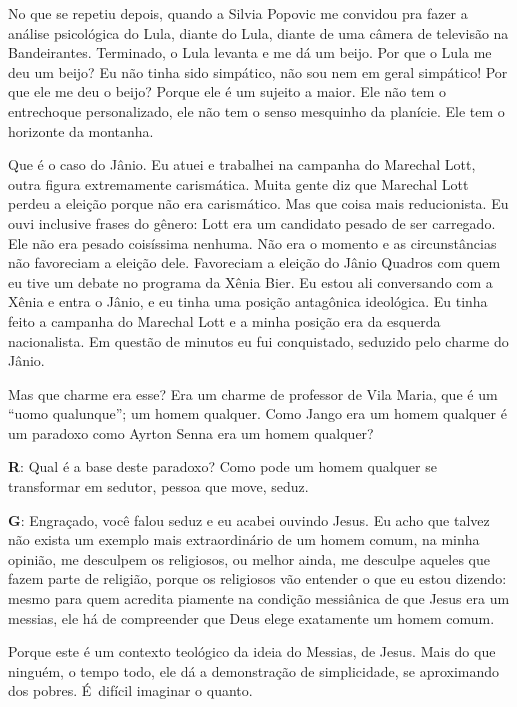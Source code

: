  

No que se repetiu depois, quando a Silvia Popovic me convidou pra fazer
a análise psicológica do Lula, diante do Lula, diante de uma câmera de
televisão na  Bandeirantes. Terminado, o Lula levanta e me dá um
beijo. Por que o Lula me deu um beijo? Eu não tinha sido simpático, não
sou nem em geral simpático! Por que ele me deu o beijo? Porque ele é um
sujeito a maior. Ele não tem o entrechoque personalizado, ele não tem o
senso mesquinho da planície. Ele tem o horizonte da montanha.

 

Que é o caso do Jânio. Eu atuei e trabalhei na campanha do Marechal
Lott, outra figura extremamente carismática. Muita gente diz que
Marechal Lott perdeu a eleição porque não era carismático. Mas que coisa
mais reducionista. Eu ouvi inclusive frases do gênero: Lott era um
candidato pesado de ser carregado. Ele não era pesado coisíssima
nenhuma. Não era o momento e as circunstâncias não favoreciam a eleição
dele. Favoreciam a eleição do Jânio Quadros com quem eu tive um debate
no programa da Xênia Bier. Eu estou ali conversando com a Xênia e entra
o Jânio, e eu tinha uma posição antagônica ideológica. Eu tinha feito a
campanha do Marechal Lott e a minha posição era da esquerda
nacionalista. Em questão de minutos eu fui conquistado, seduzido pelo
charme do Jânio.

 

Mas que charme era esse? Era um charme de professor de Vila Maria, que é
um ``uomo qualunque''; um homem qualquer. Como Jango era um homem
qualquer é um paradoxo como Ayrton Senna era um homem qualquer?

 

\textbf{R}: Qual é a base deste paradoxo? Como pode um homem qualquer se
transformar em sedutor, pessoa que move, seduz.

 

\textbf{G}: Engraçado, você falou seduz e eu acabei ouvindo Jesus. Eu
acho que talvez não exista um exemplo mais extraordinário de um homem
comum, na minha opinião, me desculpem os religiosos, ou melhor ainda, me
desculpe aqueles que fazem parte de religião, porque os religiosos vão
entender o que eu estou dizendo: mesmo para quem acredita piamente na
condição messiânica de que Jesus era um messias, ele há de compreender
que Deus elege exatamente um homem comum.

Porque este é um contexto teológico da ideia do Messias, de Jesus. Mais
do que ninguém, o tempo todo, ele dá a demonstração de simplicidade, se
aproximando dos pobres. É~difícil imaginar o quanto.

